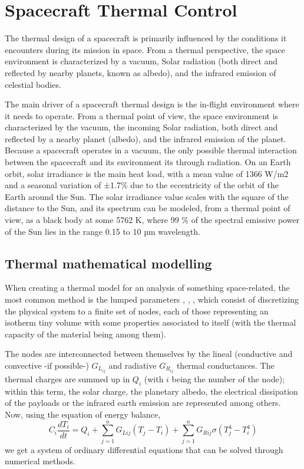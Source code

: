 \section{Spacecraft Thermal Control}

The thermal design of a spacecraft is primarily influenced by the conditions it encounters during its mission in space. From a thermal perspective, the space environment is characterized by a vacuum, Solar radiation (both direct and reflected by nearby planets, known as albedo), and the infrared emission of celestial bodies.

The main driver of a spacecraft thermal design is the in-flight environment where it needs to operate. From a thermal point of view, the space environment is characterized by the vacuum, the incoming Solar radiation, both direct and reflected by a nearby planet (albedo), and the infrared
emission of the planet. Because a spacecraft operates in a vacuum, the only possible thermal interaction between the spacecraft and its environment its through radiation. On an Earth orbit, solar irradiance is the main heat load, with a mean value of 1366 W/m2 and a seasonal variation of ±1.7\% due to the eccentricity of the orbit of the Earth around the Sun. The solar irradiance value scales with the square of the distance to the Sun, and its spectrum can be modeled, from a thermal point of view, as a black body at some 5762 K, where 99 \% of the spectral emissive power of the Sun lies in the range 0.15 to 10 µm wavelength.

\subsection{Thermal mathematical modelling}
When creating a thermal model for an analysis of something space-related, the most common method is the lumped parameters \cite{gilmore2002}, \cite{meseguer2012}, \cite{karam2012},  which consist of discretizing the physical system to a finite set of nodes, each of those representing an isotherm tiny volume with some properties associated to itself (with the thermal capacity of the material being among them). 

The nodes are interconnected between themselves by the lineal (conductive and convective -if possible-) $G_{L_{ij}}$ and radiative $G_{R_{ij}}$ thermal conductances. The thermal charges are summed up in $Q_i$ (with $i$ being the number of the node); within this term, the solar charge, the planetary albedo, the electrical dissipation of the payloads or the infrared earth emission are represented among others. Now, using the equation of energy balance,
\begin{equation}C_i\frac{dT_i}{dt}=Q_i+\sum_{j=1}^nG_{Lij}\left(T_j-T_i\right)+\sum_{j=1}^nG_{Rij}\sigma\left(T_j^4-T_i^4\right)
\label{eq: balance}
\end{equation}
we get a system of ordinary differential equations that can be solved through numerical methods.

